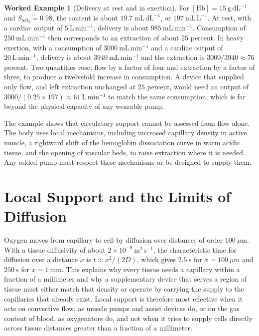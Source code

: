 \documentclass[11pt,openany]{book}
\theoremstyle{definition}
\newtheorem{example}{Worked Example}[chapter]
\theoremstyle{remark}
\begin{document}
\begin{example}[Delivery at rest and in exertion]
\label{ex:delivery}
For $[\mathrm{Hb}]=15\ \mathrm{g\,dL^{-1}}$ and $S_{aO_2}=0.98$, the content is about $19.7\ \mathrm{mL\,dL^{-1}}$, or $197\ \mathrm{mL\,L^{-1}}$. At rest, with a cardiac output of $5\ \mathrm{L\,min^{-1}}$, delivery is about $985\ \mathrm{mL\,min^{-1}}$. Consumption of $250\ \mathrm{mL\,min^{-1}}$ then corresponds to an extraction of about $25$ percent. In heavy exertion, with a consumption of $3000\ \mathrm{mL\,min^{-1}}$ and a cardiac output of $20\ \mathrm{L\,min^{-1}}$, delivery is about $3940\ \mathrm{mL\,min^{-1}}$ and the extraction is $3000/3940\approx76$ percent. Two quantities rose, flow by a factor of four and extraction by a factor of three, to produce a twelvefold increase in consumption. A device that supplied only flow, and left extraction unchanged at $25$ percent, would need an output of $3000/(0.25\times197)\approx61\ \mathrm{L\,min^{-1}}$ to match the same consumption, which is far beyond the physical capacity of any wearable pump.
\end{example}

The example shows that circulatory support cannot be assessed from flow alone. The body uses local mechanisms, including increased capillary density in active muscle, a rightward shift of the hemoglobin dissociation curve in warm acidic tissue, and the opening of vascular beds, to raise extraction where it is needed. Any added pump must respect these mechanisms or be designed to supply them.

\section{Local Support and the Limits of Diffusion}

Oxygen moves from capillary to cell by diffusion over distances of order $100\ \mu\mathrm{m}$. With a tissue diffusivity of about $2\times10^{-9}\ \mathrm{m^{2}\,s^{-1}}$, the characteristic time for diffusion over a distance $x$ is $t\approx x^{2}/(2D)$, which gives $2.5\ \mathrm{s}$ for $x=100\ \mu\mathrm{m}$ and $250\ \mathrm{s}$ for $x=1\ \mathrm{mm}$. This explains why every tissue needs a capillary within a fraction of a millimeter and why a supplementary device that serves a region of tissue must either match that density or operate by carrying the supply to the capillaries that already exist. Local support is therefore most effective when it acts on convective flow, as muscle pumps and assist devices do, or on the gas content of blood, as oxygenators do, and not when it tries to supply cells directly across tissue distances greater than a fraction of a millimeter.
\end{document}
